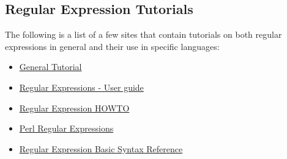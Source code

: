 \subsection{Regular Expression Tutorials}

The following is a list of a few sites that contain tutorials on both regular
expressions in general and their use in specific languages:

\begin{itemize}
  \item \href{http://www.regular-expressions.info/}{General Tutorial}
  \item \href{http://www.zytrax.com/tech/web/regex.htm}{Regular Expressions - User guide}
  \item \href{http://docs.python.org/2/howto/regex.html}{Regular Expression HOWTO}
  \item \href{http://www.troubleshooters.com/codecorn/littperl/perlreg.htm}{Perl Regular Expressions}
  \item \href{http://www.regular-expressions.info/reference.html}{Regular Expression Basic Syntax Reference}
\end{itemize}
